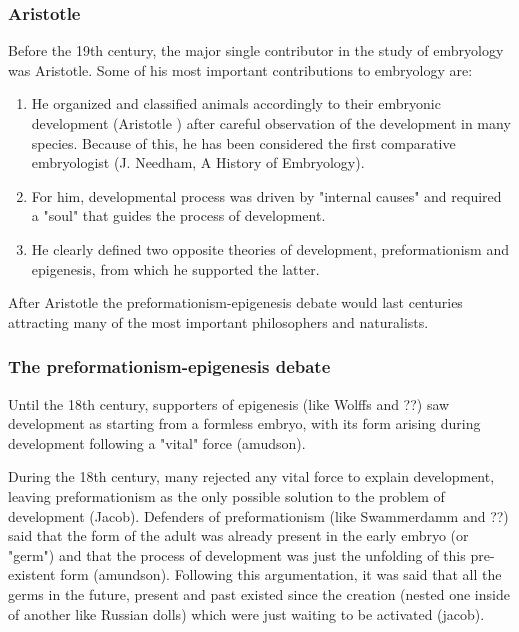 \subsubsection{Aristotle}
Before the 19th century, the major single contributor in the study of embryology was Aristotle. 
Some of his most important contributions to embryology are:

\begin{enumerate}
\item He organized and classified animals accordingly to their embryonic development (Aristotle ) after careful observation of the development in many species. Because of this, he has been considered the first comparative embryologist (J. Needham, A History of Embryology).
\item For him, developmental process was driven by "internal causes" and required a "soul" that guides the process of development.
\item He clearly defined two opposite theories of development, preformationism and epigenesis, from which he supported the latter.
\end{enumerate}

After Aristotle the preformationism-epigenesis debate would last centuries attracting many of the most important philosophers and naturalists.

\subsubsection{The preformationism-epigenesis debate}

Until the 18th century, supporters of epigenesis (like Wolffs and ??) saw development as starting from a formless embryo, with its form arising during development following a "vital" force (amudson).

During the 18th century, many rejected any vital force to explain development, leaving preformationism as the only possible solution to the problem of development (Jacob). Defenders of preformationism (like Swammerdamm and ??) said that the form of the adult was already present in the early embryo (or "germ") and that the process of development was just the unfolding of this pre-existent form (amundson). 
Following this argumentation, it was said that all the germs in the future, present and past existed since the creation (nested one inside of another like Russian dolls) which were just waiting to be activated (jacob).

